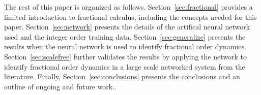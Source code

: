  The rest of this paper is organized as follows. Section~\ref{sec:fractional}
 provides a limited introduction to fractional calculus, including the concepts
 needed for this paper. Section~\ref{sec:network} presents the details of the
 artifical neural network used and the integer order training data.
 Section~\ref{sec:generalize} presents the results when the neural network is
 used to identify fractional order dynamics. Section~\ref{sec:scalefree}
 further validates the results by applying the network to identify fractional
 order dynamics in a large scale networked system from the literature. Finally,
 Section~\ref{sec:conclusions} presents the conclusions and an outline of
 ongoing and future work.. 
